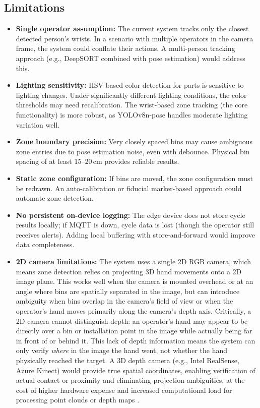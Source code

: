 \documentclass[conference]{IEEEtran}
\begin{document}
\subsection{Limitations}
\begin{itemize}
    \item \textbf{Single operator assumption:} The current system tracks only the closest detected person's wrists. In a scenario with multiple operators in the camera frame, the system could conflate their actions. A multi-person tracking approach (e.g., DeepSORT combined with pose estimation) would address this.
    \item \textbf{Lighting sensitivity:} HSV-based color detection for parts is sensitive to lighting changes. Under significantly different lighting conditions, the color thresholds may need recalibration. The wrist-based zone tracking (the core functionality) is more robust, as YOLOv8n-pose handles moderate lighting variation well.
    \item \textbf{Zone boundary precision:} Very closely spaced bins may cause ambiguous zone entries due to pose estimation noise, even with debounce. Physical bin spacing of at least 15--20\,cm provides reliable results.
    \item \textbf{Static zone configuration:} If bins are moved, the zone configuration must be redrawn. An auto-calibration or fiducial marker-based approach could automate zone detection.
    \item \textbf{No persistent on-device logging:} The edge device does not store cycle results locally; if MQTT is down, cycle data is lost (though the operator still receives alerts). Adding local buffering with store-and-forward would improve data completeness.
    \item \textbf{2D camera limitations:} The system uses a single 2D RGB camera, which means zone detection relies on projecting 3D hand movements onto a 2D image plane. This works well when the camera is mounted overhead or at an angle where bins are spatially separated in the image, but can introduce ambiguity when bins overlap in the camera's field of view or when the operator's hand moves primarily along the camera's depth axis. Critically, a 2D camera cannot distinguish depth: an operator's hand may appear to be directly over a bin or installation point in the image while actually being far in front of or behind it. This lack of depth information means the system can only verify \textit{where} in the image the hand went, not whether the hand physically reached the target. A 3D depth camera (e.g., Intel RealSense, Azure Kinect) would provide true spatial coordinates, enabling verification of actual contact or proximity and eliminating projection ambiguities, at the cost of higher hardware expense and increased computational load for processing point clouds or depth maps \cite{b11}.
\end{itemize}
\end{document}
